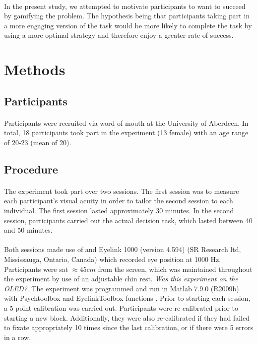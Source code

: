 \documentclass[12pt]{article}
\begin{document}
\paragraph{} In the present study, we attempted to motivate participants to want to succeed by gamifying the problem. The hypothesis being that participants taking part in a more engaging version of the task would be more likely to complete the task by using a more optimal strategy and therefore enjoy a greater rate of success. %

\section*{Methods}

\subsection*{Participants}
\paragraph{} Participants were recruited via word of mouth at the University of Aberdeen. In total, 18 participants took part in the experiment (13 female) with an age range of 20-23 (mean of 20). 

\subsection*{Procedure}
\paragraph{} The experiment took part over two sessions. The first session was to measure each participant's visual acuity in order to tailor the second session to each individual. The first session lasted approximately 30 minutes. In the second session, participants carried out the actual decision task, which lasted between 40 and 50 minutes. 

\paragraph{} Both sessions made use of and Eyelink 1000 (version 4.594) (SR Research ltd, Mississauga, Ontario, Canada) which recorded eye position at 1000 Hz. Participants were sat $\approx45cm$ from the screen, which was maintained throughout the experiment by use of an adjustable chin rest. \textit{Was this experiment on the OLED?}. The experiment was programmed and run in Matlab 7.9.0 (R2009b) with Psychtoolbox \citep{pelli1997videotoolbox} and EyelinkToolbox functions \citep{cornelissen2002eyelink}. Prior to starting each session, a 5-point calibration was carried out. Participants were re-calibrated prior to starting a new block. Additionally, they were also re-calibrated if they had failed to fixate appropriately 10 times since the last calibration, or if there were 5 errors in a row.
\end{document}
